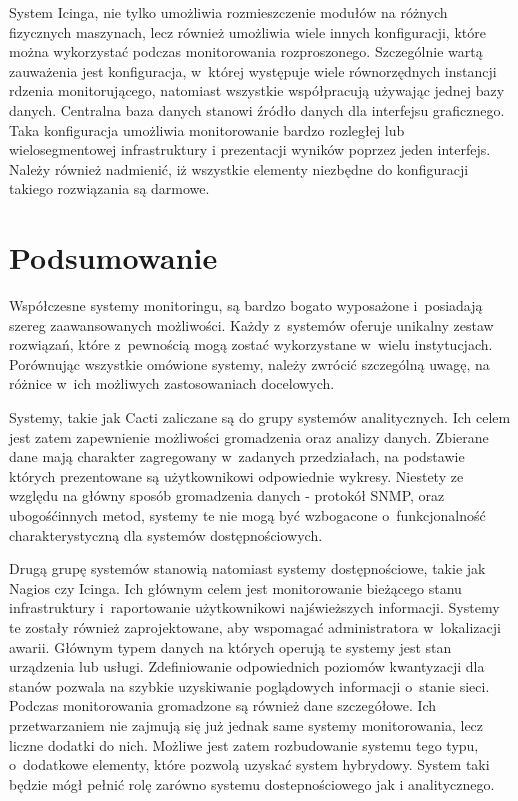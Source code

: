 System Icinga, nie tylko umożliwia rozmieszczenie modułów na różnych
fizycznych maszynach, lecz również umożliwia wiele innych
konfiguracji, które można wykorzystać podczas monitorowania
rozproszonego. Szczególnie wartą zauważenia jest konfiguracja,
w~której występuje wiele równorzędnych instancji rdzenia
monitorującego, natomiast wszystkie współpracują używając jednej bazy
danych. Centralna baza danych stanowi źródło danych dla interfejsu
graficznego. Taka konfiguracja umożliwia monitorowanie bardzo
rozległej lub wielosegmentowej infrastruktury i prezentacji wyników
poprzez jeden interfejs. Należy również nadmienić, iż wszystkie
elementy niezbędne do konfiguracji takiego rozwiązania są darmowe.

\section[Podsumowanie][Podsumowanie]{Podsumowanie}

Współczesne systemy monitoringu, są bardzo bogato wyposażone
i~posiadają szereg zaawansowanych możliwości. Każdy z~systemów oferuje
unikalny zestaw rozwiązań, które z~pewnością mogą zostać wykorzystane
w~wielu instytucjach. Porównując wszystkie omówione systemy, należy
zwrócić szczególną uwagę, na różnice w~ich możliwych zastosowaniach
docelowych.

Systemy, takie jak Cacti zaliczane są do grupy systemów
analitycznych. Ich celem jest zatem zapewnienie możliwości gromadzenia
oraz analizy danych. Zbierane dane mają charakter zagregowany
w~zadanych przedziałach, na podstawie których prezentowane są
użytkownikowi odpowiednie wykresy. Niestety ze względu na główny
sposób gromadzenia danych - protokół SNMP, oraz ubogośćinnych metod,
systemy te nie mogą być wzbogacone o~funkcjonalność charakterystyczną
dla systemów dostępnościowych.

Drugą grupę systemów stanowią natomiast systemy dostępnościowe, takie
jak Nagios czy Icinga. Ich głównym celem jest monitorowanie bieżącego
stanu infrastruktury i~raportowanie użytkownikowi najświeższych
informacji. Systemy te zostały również zaprojektowane, aby wspomagać
administratora w~lokalizacji awarii. Głównym typem danych na których
operują te systemy jest stan urządzenia lub usługi. Zdefiniowanie
odpowiednich poziomów kwantyzacji dla stanów pozwala na szybkie
uzyskiwanie poglądowych informacji o~stanie sieci. Podczas
monitorowania gromadzone są również dane szczegółowe. Ich
przetwarzaniem nie zajmują się już jednak same systemy monitorowania,
lecz liczne dodatki do nich. Możliwe jest zatem rozbudowanie systemu
tego typu, o~dodatkowe elementy, które pozwolą uzyskać system
hybrydowy. System taki będzie mógł pełnić rolę zarówno systemu
dostepnościowego jak i analitycznego.

